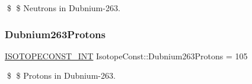 \$ \$ Neutrons in Dubnium-\/263. \mbox{\label{group___isotope_const-_dubnium-_db263_ga49a8bd62bc4b549ca104b6c02e6422d3}} 
\subsubsection{\texorpdfstring{Dubnium263\+Protons}{Dubnium263Protons}}
{\footnotesize\ttfamily \mbox{\hyperlink{group___isotope_const-_macros_ga5f18360b3e99483a35c32d789e62621c}{I\+S\+O\+T\+O\+P\+E\+C\+O\+N\+S\+T\+\_\+\+I\+NT}} Isotope\+Const\+::\+Dubnium263\+Protons = 105}

\$ \$ Protons in Dubnium-\/263. 